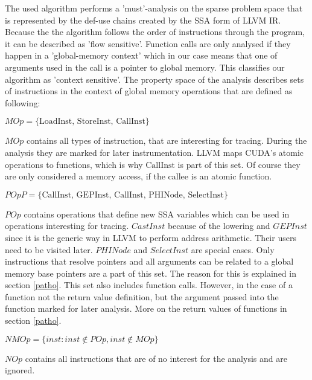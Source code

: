 


The used algorithm performs a 'must'-analysis on the sparse problem space that is represented by the def-use chains created by the SSA form of LLVM IR. Because the the algorithm follows the order of instructions through the program, it can be described as 'flow sensitive'. Function calls are only
analysed if they happen in a 'global-memory context' which in our case means that one of arguments used in the call is a pointer to global memory. This classifies our algorithm as 'context sensitive'.
The property space of the analysis describes sets of instructions in the context of global memory operations that are defined
as following:
\begin{defi}\label{mop}
	$	MOp = \{\textrm{LoadInst, StoreInst, CallInst}\} $
\end{defi}
$MOp$ contains all types of instruction, that are interesting for tracing. During the analysis they are marked for later instrumentation. LLVM maps CUDA's atomic operations to functions, which is why $\textrm{CallInst}$ is part of this set. Of course they are only considered a memory access, if the callee is an atomic function.
\begin{defi}\label{mopp}
	$   POpP = \{\textrm{CallInst, GEPInst, CallInst, PHINode, SelectInst}\} $
\end{defi}
$POp$ contains operations that define new SSA variables which can be used in operations interesting for tracing. $CastInst$ because of the lowering  and $GEPInst$ since it is the generic way in LLVM
to perform address arithmetic. Their users need to be visited later. 
$PHINode$ and $SelectInst$ are special cases. Only instructions that resolve pointers and all arguments can be related to a global memory base pointers are a part of this set. The reason for
this is explained in section \ref{patho}.
This set also includes function calls. However, in the case of a function not the return value definition, but the argument passed into the function marked for later analysis. More on the return values of functions in section \ref{patho}.
\begin{defi}\label{nmop}
	$	NMOp = \{inst : inst \notin POp, inst \notin MOp\}$
\end{defi}
$NOp$ contains all instructions that are of no interest for the analysis and are ignored.

